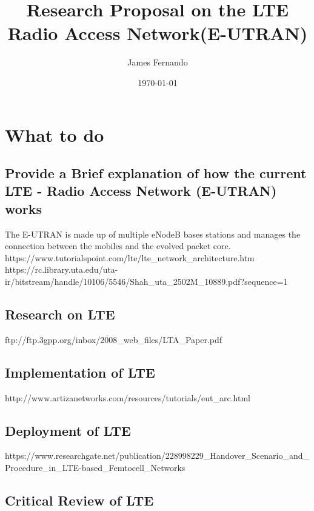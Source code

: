 \documentclass[a4paper,12pt]{scrartcl}
\title{Research Proposal on the LTE Radio Access Network(E-UTRAN)}
\author{James Fernando}
\date{\today}
\begin{document}
	
	\begin{titlepage}
		\maketitle
	\end{titlepage}
	
	\tableofcontents
	\newpage	
	\section{What to do}
	{
		\subsection{Provide a Brief explanation of how the current LTE - Radio Access Network (E-UTRAN) works}
		{
			The E-UTRAN is made up of multiple eNodeB bases stations and manages the connection between the mobiles and the evolved packet core. 
			https://www.tutorialspoint.com/lte/lte_network_architecture.htm
			https://rc.library.uta.edu/uta-ir/bitstream/handle/10106/5546/Shah_uta_2502M_10889.pdf?sequence=1
		}
		\subsection{Research on LTE}
		{
			ftp://ftp.3gpp.org/inbox/2008_web_files/LTA_Paper.pdf
		}
		\subsection{Implementation of LTE}
		{
			http://www.artizanetworks.com/resources/tutorials/eut_arc.html
		}
		\subsection{Deployment of LTE}
		{
			https://www.researchgate.net/publication/228998229_Handover_Scenario_and_Procedure_in_LTE-based_Femtocell_Networks
		}
		\subsection{Critical Review of LTE}
		{
		
		}
	}
	
	\newpage
	
	\printbibliography[heading=bibintoc,title=References]
\end{document}
